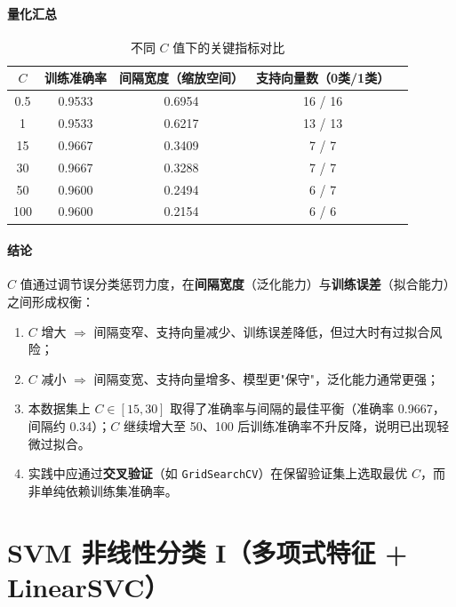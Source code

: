 \documentclass[10.5pt]{config}
\begin{document}
\paragraph{量化汇总}
\begin{table}[H]
    \centering
    \caption{不同 $C$ 值下的关键指标对比}
    \begin{tabular}{ccccc}
        \hline
        $C$ & 训练准确率 & 间隔宽度（缩放空间） & 支持向量数（0类/1类） \\
        \hline
        0.5  & 0.9533 & 0.6954 & 16 / 16 \\
        1    & 0.9533 & 0.6217 & 13 / 13 \\
        15   & 0.9667 & 0.3409 &  7 /  7 \\
        30   & 0.9667 & 0.3288 &  7 /  7 \\
        50   & 0.9600 & 0.2494 &  6 /  7 \\
        100  & 0.9600 & 0.2154 &  6 /  6 \\
        \hline
    \end{tabular}
    \label{tab:c_compare}
\end{table}

\paragraph{结论}
$C$ 值通过调节误分类惩罚力度，在\textbf{间隔宽度}（泛化能力）与\textbf{训练误差}（拟合能力）之间形成权衡：
\begin{enumerate}
    \item $C$ 增大 $\Rightarrow$ 间隔变窄、支持向量减少、训练误差降低，但过大时有过拟合风险；
    \item $C$ 减小 $\Rightarrow$ 间隔变宽、支持向量增多、模型更"保守"，泛化能力通常更强；
    \item 本数据集上 $C\in[15,30]$ 取得了准确率与间隔的最佳平衡（准确率 0.9667，间隔约 0.34）；$C$ 继续增大至 50、100 后训练准确率不升反降，说明已出现轻微过拟合。
    \item 实践中应通过\textbf{交叉验证}（如 \texttt{GridSearchCV}）在保留验证集上选取最优 $C$，而非单纯依赖训练集准确率。
\end{enumerate}

\clearpage
\section{SVM 非线性分类 I（多项式特征 + LinearSVC）}
\end{document}
